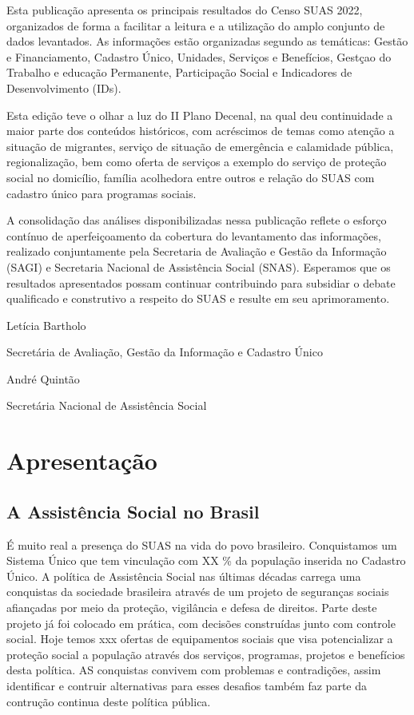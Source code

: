 \documentclass[
  brazilian]{report}
\begin{document}
Esta publicação apresenta os principais resultados do Censo SUAS 2022,
organizados de forma a facilitar a leitura e a utilização do amplo
conjunto de dados levantados. As informações estão organizadas segundo
as temáticas: Gestão e Financiamento, Cadastro Único, Unidades, Serviços
e Benefícios, Gestçao do Trabalho e educação Permanente, Participação
Social e Indicadores de Desenvolvimento (IDs).

Esta edição teve o olhar a luz do II Plano Decenal, na qual deu
continuidade a maior parte dos conteúdos históricos, com acréscimos de
temas como atenção a situação de migrantes, serviço de situação de
emergência e calamidade pública, regionalização, bem como oferta de
serviços a exemplo do serviço de proteção social no domicílio, família
acolhedora entre outros e relação do SUAS com cadastro único para
programas sociais.

A consolidação das análises disponibilizadas nessa publicação reflete o
esforço contínuo de aperfeiçoamento da cobertura do levantamento das
informações, realizado conjuntamente pela Secretaria de Avaliação e
Gestão da Informação (SAGI) e Secretaria Nacional de Assistência Social
(SNAS). Esperamos que os resultados apresentados possam continuar
contribuindo para subsidiar o debate qualificado e construtivo a
respeito do SUAS e resulte em seu aprimoramento.

Letícia Bartholo

Secretária de Avaliação, Gestão da Informação e Cadastro Único

André Quintão

Secretária Nacional de Assistência Social

\tableofcontents

\hypertarget{apresentauxe7uxe3o}{%
\chapter*{Apresentação}\label{apresentauxe7uxe3o}}

\hypertarget{a-assistuxeancia-social-no-brasil}{%
\section*{A Assistência Social no
Brasil}\label{a-assistuxeancia-social-no-brasil}}

É muito real a presença do SUAS na vida do povo brasileiro. Conquistamos
um Sistema Único que tem vinculação com XX \% da população inserida no
Cadastro Único. A política de Assistência Social nas últimas décadas
carrega uma conquistas da sociedade brasileira através de um projeto de
seguranças sociais afiançadas por meio da proteção, vigilância e defesa
de direitos. Parte deste projeto já foi colocado em prática, com
decisões construídas junto com controle social. Hoje temos xxx ofertas
de equipamentos sociais que visa potencializar a proteção social a
população através dos serviços, programas, projetos e benefícios desta
política. AS conquistas convivem com problemas e contradições, assim
identificar e contruir alternativas para esses desafios também faz parte
da contrução continua deste política pública.
\end{document}
